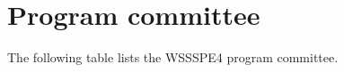 \documentclass[11pt, oneside]{amsart}
\begin{document}
{\scriptsize
\begin{longtable}{lll}

\end{longtable}
}

\section{Program committee}  \label{sec:progcom}
The following table lists the WSSSPE4 program committee.

{\scriptsize
\begin{longtable}{lll}

\end{longtable}
}

%




\end{document}
